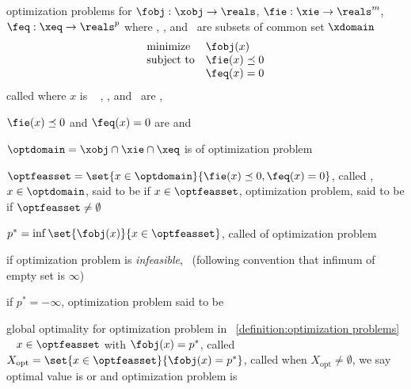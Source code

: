 \documentclass[17pt,landscape]{foils}
\begin{document}
{


\begin{mydefinition}{optimization problems}
	for $\fobj:\xobj \to \reals$, $\fie: \xie\to \reals^m$, $\feq: \xeq \to \reals^p$
	where \xobj, \xie, and \xeq\ are subsets of common set $\xdomain$
	$$
		\begin{array}{ll}
			\mbox{minimize}
				& \fobj(x)
			\\
			\mbox{subject to}
				& \fie(x) \preceq 0
			\\
				& \feq(x) =0
		\end{array}
	$$
	called 
	where $x$ is 
	\shrinkspacewithintheoremslike\
	\ibit
	\iitem
		\fobj, \fie, and \feq\ are
		,

	\iitem
		$\fie(x) \preceq 0$ and $\feq(x) = 0$
		are
		and

	\iitem
		$\optdomain = \xobj \cap \xie \cap \xeq$ is  of optimization problem

	\iitem
		$\optfeasset =\set{x\in \optdomain}{\fie(x) \preceq0, \feq(x)=0}$, called ,
		$x\in\optdomain$, said to be  if $x\in\optfeasset$,
		optimization problem, said to be \define{feasible} if $\optfeasset\neq \emptyset$\

	\iitem
		$p^\ast = \inf\set{\fobj(x)}{x\in\optfeasset}$, called  of optimization problem

	\iitem
		if optimization problem is \emph{infeasible}, \
		(following convention that infimum of empty set is $\infty$)

	\iitem
		if $p^\ast=-\infty$,
		optimization problem
		said to be 
\eit
\end{mydefinition}



\begin{mydefinition}{global optimality}
	for optimization problem
	in ~\ref{definition:optimization problems}
	\shrinkspacewithintheoremslike\
	\ibit
	\iitem
		$x\in \optfeasset$ with $\fobj(x) = p^\ast$, called \
	\iitem
		$X_\mathrm{opt} = \set{x\in \optfeasset}{\fobj(x)=p^\ast}$, called 
	\iitem
		when $X_\mathrm{opt} \neq \emptyset$, we say optimal value is \define{attained} or 
		and
		optimization problem is 
	\eit
\end{mydefinition}

}
\end{document}
